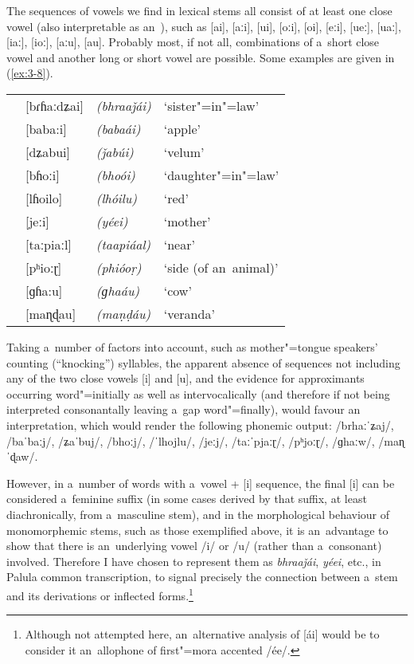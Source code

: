 The sequences of vowels we find in lexical stems all consist of at least one close vowel (also interpretable as an~), such as [ai], [aːi], [ui], [oːi], [oi], [eːi], [ueː], [uaː], [iaː], [ioː], [aːu], [au]. Probably most, if not all, combinations of a~short close vowel and another long or short vowel are possible. Some examples are given in (\ref{ex:3-8}).


\begin{exe}
\extab
\label{ex:3-8}
\begin{tabularx}{\textwidth}{ l l l l }
&
[bɾɦaːdʑai] &
\textit{(bhraaǰái)} &
`sister"=in"=law'\\
&
[baba:i] &
\textit{(babaái)} &
`apple'\\
&
[dʑabui] &
\textit{(ǰabúi)} &
`velum'\\
&
[bɦoːi] &
\textit{(bhoói)} &
`daughter"=in"=law'\\
&
[lɦoilo] &
\textit{(lhóilu)} &
`red'\\
&
[jeːi] &
\textit{(yéei)} &
`mother'\\
&
[taːpiaːl] &
\textit{(taapiáal)} &
`near'\\
&
[pʰioːɽ] &
\textit{(phióoṛ)} &
`side (of an~animal)' \\
&
[ɡɦa:u] &
\textit{(ɡhaáu)} &
`cow'\\
&
[maɳɖau] &
\textit{(maṇḍáu)} &
`veranda'\\
\end{tabularx}
\end{exe}


Taking a~number of factors into account, such as mother"=tongue speakers' counting (``knocking'') syllables, the apparent absence of sequences not including any of the two close vowels [i] and [u], and the evidence for approximants occurring word"=initially as well as intervocalically (and therefore if not being interpreted consonantally leaving a~gap word"=finally), would favour an~ interpretation, which would render the following phonemic output: /brhaːˈʑaj/, /baˈbaːj/, /ʑaˈbuj/, /bhoːj/, /ˈlhojlu/, /jeːj/, /taːˈpjaːɽ/, /pʰjoːɽ/, /ɡhaːw/, /maɳˈɖaw/.


However, in a~number of words with a~vowel + [i] sequence, the final [i] can be considered a~feminine  suffix (in some cases derived by that suffix, at least diachronically, from a~masculine stem), and in the morphological behaviour of monomorphemic stems, such as those exemplified above, it is an~advantage to show that there is an~underlying vowel /i/ or /u/ (rather than a~consonant) involved. Therefore I have chosen to represent them as \textit{bhraaǰái}, \textit{yéei}, etc., in Palula common transcription, to signal precisely the connection between a~stem and its derivations or inflected forms.\footnote{Although not attempted here, an~alternative analysis of [ái] would be to consider it an~allophone of first"=mora accented /ée/.} 


